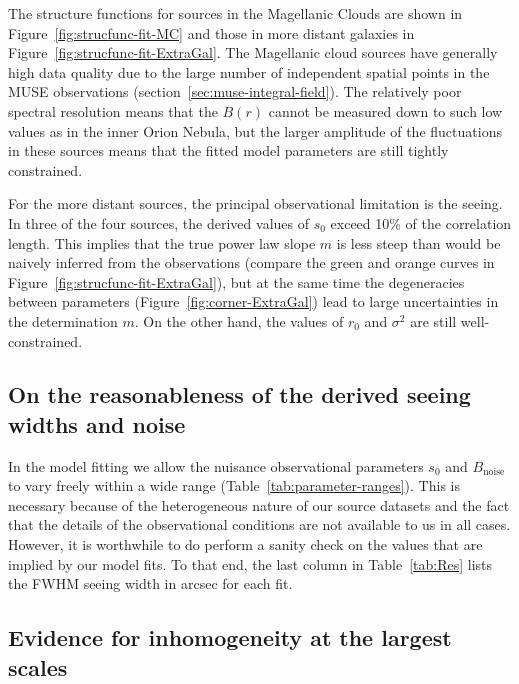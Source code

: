\documentclass[fleqn,usenatbib, useAMS, a4paper]{mnras}
\newcommand\noise{\ensuremath{_{\text{noise}}}}
\begin{document}

The structure functions for sources in the Magellanic Clouds are shown in Figure~\ref{fig:strucfunc-fit-MC}
and those in more distant galaxies in Figure~\ref{fig:strucfunc-fit-ExtraGal}.
The Magellanic cloud sources have generally high data quality due to the
large number of independent spatial points in the MUSE observations
(section~\ref{sec:muse-integral-field}).
The relatively poor spectral resolution means that the \(B(r)\) cannot
be measured down to such low values as in the inner Orion Nebula,
but the larger amplitude of the fluctuations in these sources means
that the fitted model parameters are still tightly constrained.

For the more distant sources, the principal observational limitation is the seeing.
In three of the four sources,
the derived values of \(s_0\) exceed 10\% of the correlation length.
This implies that the true power law slope \(m\) is less steep than
would be naively inferred from the observations
(compare the green and orange curves in Figure~\ref{fig:strucfunc-fit-ExtraGal}),
but at the same time the degeneracies between parameters
(Figure~\ref{fig:corner-ExtraGal})
lead to large uncertainties in the determination \(m\).
On the other hand, the values of \(r_0\) and \(\sigma^2\) are still well-constrained.


\subsection{On the reasonableness of the derived seeing widths and noise}
\label{sec:sanity-check-derived}
In the model fitting we allow the nuisance observational parameters
\(s_0\) and \(B\noise\) to vary freely within a wide range
(Table~\ref{tab:parameter-ranges}).
This is necessary because of the heterogeneous nature of our source datasets
and the fact that the details of the observational conditions
are not available to us in all cases.
However, it is worthwhile to do perform a sanity check on the values that are implied by our model fits.
To that end, the last column in Table~\ref{tab:Res} lists the FWHM seeing width in arcsec for each fit. 

\subsection{Evidence for inhomogeneity at the largest scales}
\label{sec:evid-inhom-at}
\end{document}
